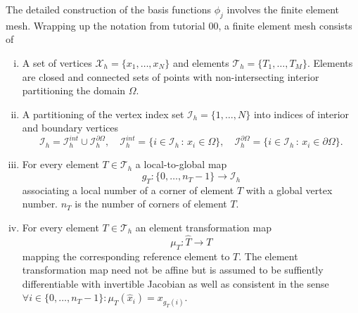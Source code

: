 \documentclass[a4paper,12pt]{article}
\begin{document}
The detailed construction of the basis functions $\phi_j$ involves the finite element mesh.
Wrapping up the notation from tutorial 00, a finite element mesh consists of
\begin{enumerate}[i)]
\item A set of vertices $\mathcal{X}_h = \{x_1,\ldots,x_N\}$ and
elements $\mathcal{T}_h = \{T_1, \ldots, T_M\}$. Elements are closed and connected sets of points
with non-intersecting interior partitioning the domain $\Omega$.
\item A partitioning of the vertex index set $\mathcal{I}_h=\{1,\ldots,N\}$
into indices of interior and boundary vertices
\begin{equation*}
\mathcal{I}_h = \mathcal{I}_h^{int}\cup\mathcal{I}_h^{\partial\Omega},
\quad \mathcal{I}_h^{int} = \{i\in \mathcal{I}_h\,:\, x_i\in\Omega\},
\quad \mathcal{I}_h^{\partial\Omega} = \{i\in \mathcal{I}_h\,:\, x_i\in\partial\Omega\}.
\end{equation*}
\item For every element $T\in\mathcal{T}_h$ a local-to-global map
$$g_T:\{0,\ldots,n_T-1\}\to\mathcal{I}_h$$
associating a local number of a corner of element $T$ with a global vertex number.
$n_T$ is the number of corners of element $T$.
\item For every element $T\in\mathcal{T}_h$ an element transformation map
$$\mu_T : \hat T \to T$$
mapping the corresponding reference element to $T$. The element transformation
map need not be affine but is assumed to be suffiently differentiable with invertible
Jacobian as well as consistent in the sense
$\forall i\in\{0,\ldots,n_T-1\} : \mu_T(\hat x_i) = x_{g_T(i)}$.
\end{enumerate}
\end{document}
